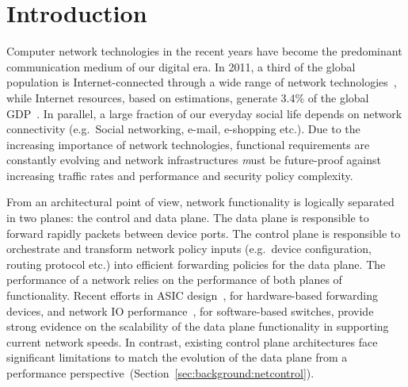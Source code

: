 \chapter{Introduction} 

Computer network technologies in the recent years have become the predominant
communication medium of our digital era.  In 2011, a third of the global
population is Internet-connected through a wide range of network
technologies~\cite{itufacts2011}, while Internet resources, based on
estimations, generate 3.4\% of the global GDP~\cite{duRausas:2011un}. In
parallel, a large fraction of our everyday social life depends on network
connectivity (e.g.~Social networking, e-mail, e-shopping etc.). Due to the
increasing importance of network technologies, functional requirements are
constantly evolving and network infrastructures {\emph must} be future-proof
against increasing traffic rates and performance and security policy complexity.

From an architectural point of view, network functionality is logically
separated in two planes: the control and data plane. The data plane is
responsible to forward rapidly packets between device ports.  The control plane
is responsible to orchestrate and transform network policy inputs (e.g.~device
configuration, routing protocol etc.) into efficient forwarding policies for the
data plane. The performance of a network relies on the performance of both
planes of functionality. Recent efforts in ASIC design~\cite{covington13}, for
hardware-based forwarding devices, and network IO
performance~\cite{routebricks,rizzo12,Han10}, for software-based switches,
provide strong evidence on the scalability of the data plane functionality in
supporting current network speeds.  In contrast, existing control plane
architectures face significant limitations to match the evolution of the data
plane from a performance perspective~(Section~\ref{sec:background:netcontrol}). 

